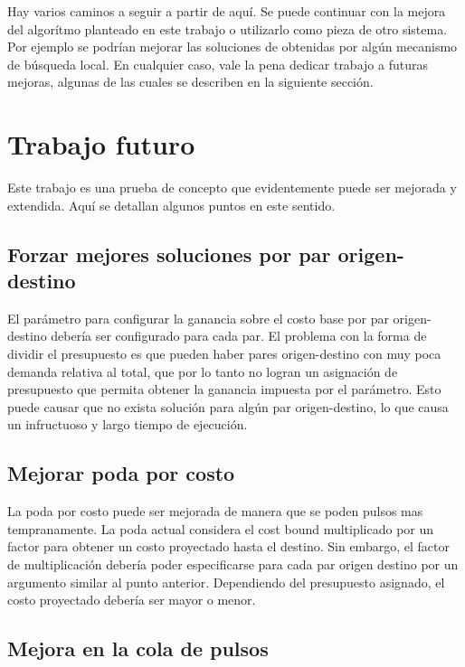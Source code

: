 \documentclass{article}
\begin{document}
  Hay varios caminos a seguir a partir de aquí. Se puede continuar con la mejora del algorítmo planteado en este trabajo o utilizarlo como pieza de otro sistema. Por ejemplo se podrían mejorar las soluciones de obtenidas por algún mecanismo de búsqueda local. En cualquier caso, vale la pena dedicar trabajo a futuras mejoras, algunas de las cuales se describen en la siguiente sección.

  \section*{Trabajo futuro}

  Este trabajo es una prueba de concepto que evidentemente puede ser mejorada y extendida. Aquí se detallan algunos puntos en este sentido.

  \subsection*{Forzar mejores soluciones por par origen-destino}

  El parámetro para configurar la ganancia sobre el costo base por par origen-destino debería ser configurado para cada par. El problema con la forma de dividir el presupuesto es que pueden haber pares origen-destino con muy poca demanda relativa al total, que por lo tanto no logran un asignación de presupuesto que permita obtener la ganancia impuesta por el parámetro. Esto puede causar que no exista solución para algún par origen-destino, lo que causa un infructuoso y largo tiempo de ejecución.

  \subsection*{Mejorar poda por costo}

  La poda por costo puede ser mejorada de manera que se poden pulsos mas tempranamente. La poda actual considera el cost bound multiplicado por un factor para obtener un costo proyectado hasta el destino. Sin embargo, el factor de multiplicación debería poder especificarse para cada par origen destino por un argumento similar al punto anterior. Dependiendo del presupuesto asignado, el costo proyectado debería ser mayor o menor.

  \subsection*{Mejora en la cola de pulsos}
\end{document}
